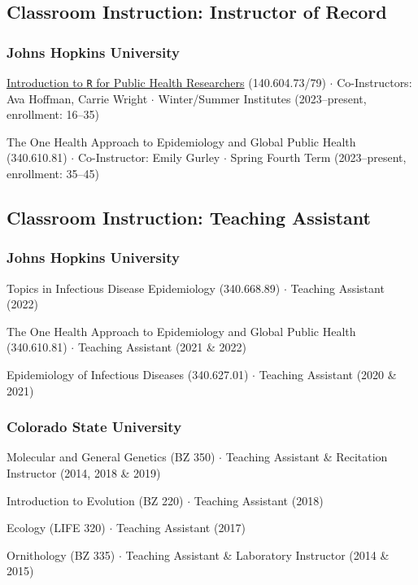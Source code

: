\documentclass{cv}
\begin{document}
\subsection*{Classroom Instruction: Instructor of Record}

\subsubsection*{Johns Hopkins University}

\href{https://jhudatascience.org/intro_to_r/}{Introduction to \texttt{R} for Public Health Researchers} (140.604.73/79) $\cdot$ Co-Instructors: Ava Hoffman, Carrie Wright $\cdot$ Winter/Summer Institutes (2023--present, enrollment: 16--35)

The One Health Approach to Epidemiology and Global Public Health (340.610.81) $\cdot$ Co-Instructor: Emily Gurley $\cdot$ Spring Fourth Term (2023--present, enrollment: 35--45)


\subsection*{Classroom Instruction: Teaching Assistant}

\subsubsection*{Johns Hopkins University}

Topics in Infectious Disease Epidemiology (340.668.89) $\cdot$ Teaching Assistant (2022)

The One Health Approach to Epidemiology and Global Public Health (340.610.81) $\cdot$ Teaching Assistant (2021 \& 2022)

Epidemiology of Infectious Diseases (340.627.01) $\cdot$ Teaching Assistant (2020 \& 2021)

\subsubsection*{Colorado State University}

Molecular and General Genetics (BZ 350) $\cdot$ Teaching Assistant \& Recitation Instructor (2014, 2018 \& 2019)

Introduction to Evolution (BZ 220) $\cdot$ Teaching Assistant (2018)

Ecology (LIFE 320) $\cdot$ Teaching Assistant (2017)

Ornithology (BZ 335) $\cdot$ Teaching Assistant \& Laboratory Instructor (2014 \& 2015)
\end{document}
